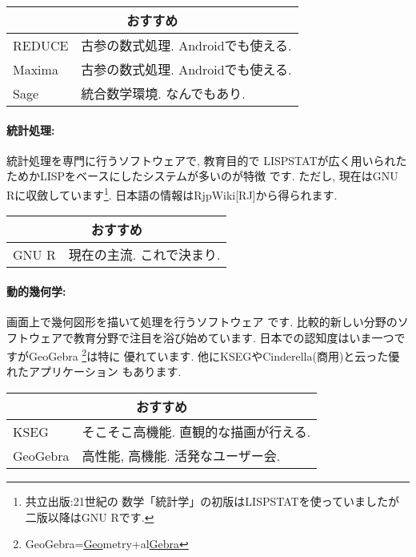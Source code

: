 \documentclass[b5j,8pt,twocolumn]{ltjsarticle}
\begin{document}
\vspace{0.5cm}
{\footnotesize
\begin{tabularx}{7cm}{l X}
\multicolumn{2}{c}{おすすめ}\\\hline
REDUCE& 古参の数式処理. Androidでも使える.\\
Maxima& 古参の数式処理. Androidでも使える.\\
Sage&   統合数学環境. なんでもあり.\\\hline
\end{tabularx}
}
\vspace{0.5cm}

\paragraph{統計処理:} 統計処理を専門に行うソフトウェアで, 教育目的で
LISPSTATが広く用いられたためかLISPをベースにしたシステムが多いのが特徴
です. ただし, 現在はGNU Rに収斂しています\footnote{共立出版:21世紀の
数学「統計学」の初版はLISPSTATを使っていましたが二版以降はGNU Rです.}.
 日本語の情報はRjpWiki[RJ]から得られます.

\vspace{0.5cm}
{\footnotesize
\begin{tabularx}{7cm}{l X}
\multicolumn{2}{c}{おすすめ}\\\hline
GNU R& 現在の主流. これで決まり.\\\hline
\end{tabularx}
}
\vspace{0.5cm}

\paragraph{動的幾何学:} 画面上で幾何図形を描いて処理を行うソフトウェア
です. 比較的新しい分野のソフトウェアで教育分野で注目を浴び始めています.
 日本での認知度はいま一つですがGeoGebra
 \footnote{GeoGebra=\underline{Geo}metry+al\underline{Gebra}}は特に
優れています. 他にKSEGやCinderella(商用)と云った優れたアプリケーション
もあります.


\vspace{0.5cm}
{\footnotesize
\begin{tabularx}{7cm}{l X}
\multicolumn{2}{c}{おすすめ}\\\hline
KSEG& そこそこ高機能. 直観的な描画が行える.\\
GeoGebra&  高性能, 高機能. 活発なユーザー会.\\\hline
\end{tabularx}
}
\vspace{0.5cm}
\end{document}
